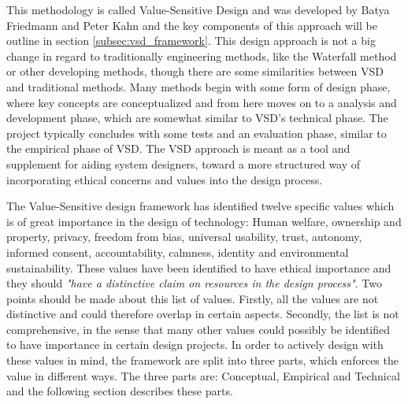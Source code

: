 This methodology is called Value-Sensitive Design and was developed by Batya Friedmann and Peter Kahn and the key components of this approach will be outline in section \ref{subsec:vsd_framework}.\newline
This design approach is not a big change in regard to traditionally engineering methods, like the Waterfall method or other developing methods, though there are some similarities between VSD and traditional methods. Many methods begin with some form of design phase, where key concepts are conceptualized and from here moves on to a analysis and development phase, which are somewhat similar to VSD's technical phase. The project typically concludes with some tests and an evaluation phase, similar to the empirical phase of VSD\citep[p. 704]{IntegratingEthicsCummings}.\newline
The VSD approach is meant as a tool and supplement for aiding system designers, toward a more structured way of incorporating ethical concerns and values into the design process.\newline 

The Value-Sensitive design framework has identified twelve specific values which is of great importance in the design of technology: Human welfare, ownership and property, privacy, freedom from bias, universal usability, trust, autonomy, informed consent, accountability, calmness, identity and environmental sustainability. These values have been identified to have ethical importance and they should \textit{"have a distinctive claim on resources in the design process"}\citep[p. 1187]{HumanValuesEthicsAndDesign}. Two points should be made about this list of values. Firstly, all the values are not distinctive and could therefore overlap in certain aspects. Secondly, the list is not comprehensive, in the sense that many other values could possibly be identified to have importance in certain design projects.\newline 
In order to actively design with these values in mind, the framework are split into three parts, which enforces the value in different ways. The three parts are: Conceptual, Empirical and Technical and the following section describes these parts. 

